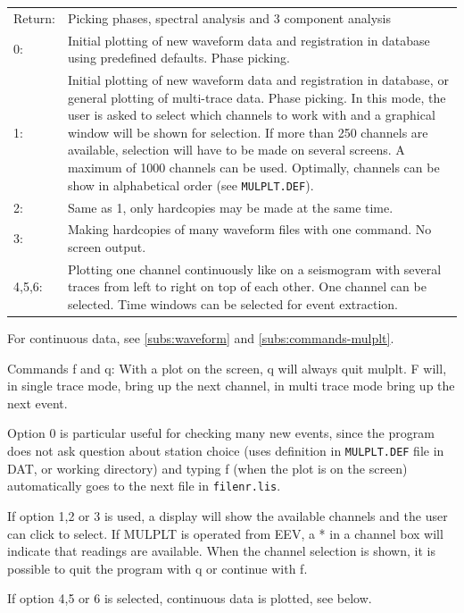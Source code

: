 \begin{tabular}{lp{8cm}}
Return: & Picking phases, spectral analysis and 3 component analysis  \\
0: &  Initial plotting of new waveform data and \index{Registration}registration in database using  
predefined  
defaults. Phase picking.  \\
1: &  Initial plotting of new waveform data and registration in database, or general plotting  
of multi-trace data. Phase picking. In this mode, the user is asked to select which channels to  
work with and a graphical window will be shown for selection. If more than 250 channels are  
available, selection will have to be made on several screens. A maximum of 1000 channels  
can  be used. Optimally, channels can be show in alphabetical order (see \texttt{MULPLT.DEF}).  \\
2: &  Same as 1, only hardcopies may be made at the same time.  \\
3: &  Making hardcopies of many waveform files with one command. No screen output.   \\
4,5,6: &  Plotting one channel continuously like on a seismogram with several traces from left   
to right on top of each other. One channel can be selected. Time windows can be selected for  
event extraction.  \\
\end{tabular}

For continuous data, see \ref{subs:waveform} and \ref{subs:commands-mulplt}. 

Commands f and q: With a plot on the screen, q will always quit mulplt. F will, in single trace mode, bring up the next channel, in multi trace mode bring up the next event. 

Option 0 is particular useful for checking many new events, since the program does not ask question about station choice (uses definition in \texttt{MULPLT.DEF} file in DAT, or working directory) and typing f (when the plot is on the screen) automatically goes to the next file in \texttt{filenr.lis}. 

If option 1,2 or 3 is used, a display will show the available channels and the user can click to select. If MULPLT is operated from EEV, a * in a channel box will indicate that readings are available. When the channel selection is shown, it is possible to quit the program with q or continue with f. 

If option 4,5 or 6 is selected, continuous data is plotted, see below. 

